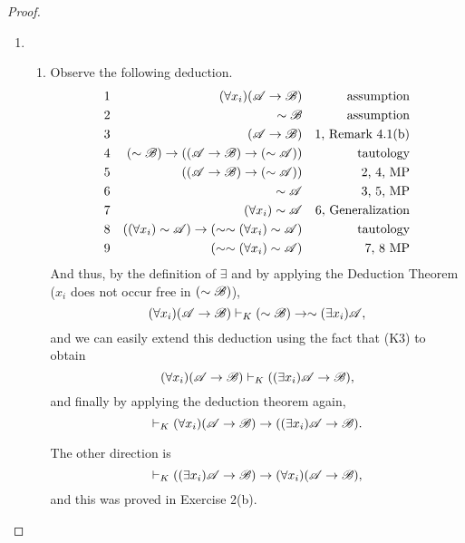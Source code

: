 \begin{proposition}
\begin{proof}
\begin{enumerate}
      \item 
        \begin{enumerate}
          \item Observe the following deduction.
            \begin{align*}
              \text{1}&&
              (\forall x_i)(\mathscr{A} \rightarrow \mathscr{B})&&
              \text{assumption}\\
              \text{2}&&
              \sim\mathscr{B}&&
              \text{assumption}\\
              \text{3}&&
              (\mathscr{A} \rightarrow \mathscr{B})&&
              \text{1, Remark 4.1(b)}\\
              \text{4}&&
              (\sim\mathscr{B}) \rightarrow ((\mathscr{A} \rightarrow \mathscr{B}) \rightarrow (\sim\mathscr{A}))&&
              \text{tautology}\\
              \text{5}&&
              ((\mathscr{A} \rightarrow \mathscr{B}) \rightarrow (\sim\mathscr{A}))&&
              \text{2, 4, MP}\\
              \text{6}&&
              \sim\mathscr{A}&&
              \text{3, 5, MP}\\
              \text{7}&&
              (\forall x_i)\sim\mathscr{A}&&
              \text{6, Generalization}\\
              \text{8}&&
              ((\forall x_i)\sim\mathscr{A}) \rightarrow (\sim\sim(\forall x_i)\sim\mathscr{A})&&
              \text{tautology}\\
              \text{9}&&
              (\sim\sim(\forall x_i)\sim\mathscr{A})&&
              \text{7, 8 MP}
            \end{align*}
            And thus, by the definition of \(\exists\) and by applying the Deduction Theorem (\(x_i\) does not occur free in \((\sim\mathscr{B})\)),
            \[(\forall x_i)(\mathscr{A} \rightarrow \mathscr{B}) \vdash_{K} (\sim\mathscr{B}) \rightarrow \sim(\exists x_i)\mathscr{A},\]
            and we can easily extend this deduction using the fact that (K3) to obtain
            \[(\forall x_i)(\mathscr{A} \rightarrow \mathscr{B}) \vdash_{K} ((\exists x_i)\mathscr{A} \rightarrow \mathscr{B}),\]
            and finally by applying the deduction theorem again,
            \[\vdash_{K} (\forall x_i)(\mathscr{A} \rightarrow \mathscr{B}) \rightarrow ((\exists x_i)\mathscr{A} \rightarrow \mathscr{B}).\]

            The other direction is
            \[\vdash_{K} ((\exists x_i)\mathscr{A} \rightarrow \mathscr{B}) \rightarrow (\forall x_i)(\mathscr{A} \rightarrow \mathscr{B}),\]
            and this was proved in Exercise 2(b).


\end{enumerate}
\end{enumerate}
\end{proof}
\end{proposition}

